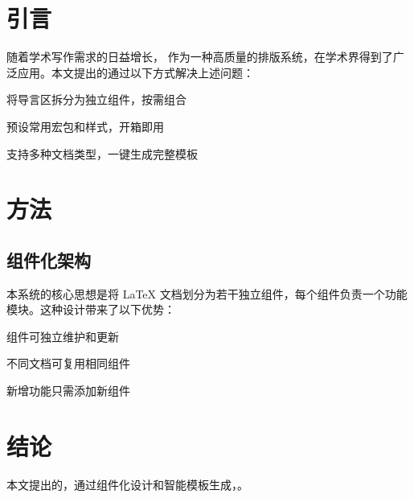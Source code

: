 \title{}
\author{test}
\date{\today}

\begin{abstract}

\end{abstract}

\section{引言}

随着学术写作需求的日益增长， 作为一种高质量的排版系统，在学术界得到了广泛应用。本文提出的通过以下方式解决上述问题：

\begin{mylist}
  \item 将导言区拆分为独立组件，按需组合
  \item 预设常用宏包和样式，开箱即用
  \item 支持多种文档类型，一键生成完整模板
\end{mylist}

\section{方法}

\subsection{组件化架构}

本系统的核心思想是将 LaTeX 文档划分为若干独立组件，每个组件负责一个功能模块。这种设计带来了以下优势：

\begin{mylist}
  \item 组件可独立维护和更新
  \item 不同文档可复用相同组件
  \item 新增功能只需添加新组件
\end{mylist}

\section{结论}

本文提出的，通过组件化设计和智能模板生成，。

